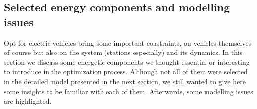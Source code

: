 \begin{bibunit}[ieeetr]
%
%




\subsection{Selected energy components and modelling issues}
Opt for electric vehicles bring some important constraints, on vehicles themselves of course but also on the system (stations especially) and its dynamics.
In this section we discuss some energetic components we thought essential or interesting to introduce in the optimization process.
Although not all of them were selected in the detailed model presented in the next section, we still wanted to give here some insights to be familiar with each of them.
Afterwards, some modelling issues are highlighted.


\end{bibunit}
